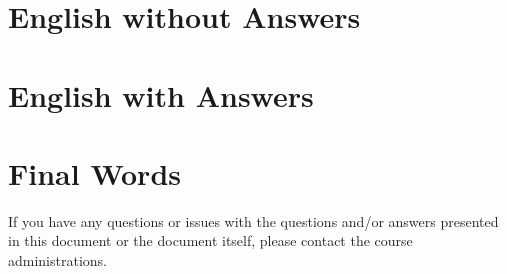 \documentclass[a4paper,11pt,oneside]{book}
\begin{document}
\begin{sloppypar}
\chapter{English without Answers}
\label{englishWithoutAnswers}


\chapter{English with Answers}
\label{englishWithAnswers}










\chapter{Final Words}
\label{finalWords}
If you have any questions or issues with the questions and/or answers presented in this document or the document itself, please contact the course administrations.

\pagebreak

\printbibliography

\end{sloppypar}
\end{document}
